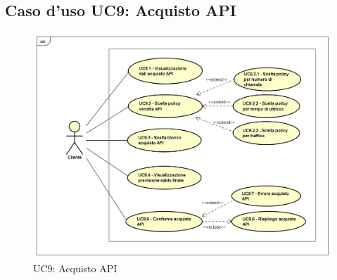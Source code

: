 \newpage
\subsection{Caso d'uso UC9: Acquisto API}
\label{UC9}
\begin{figure}[ht]
	\centering
	\includegraphics[scale=0.45]{UML/UC9.png}
	\caption{UC9: Acquisto API}
\end{figure}

